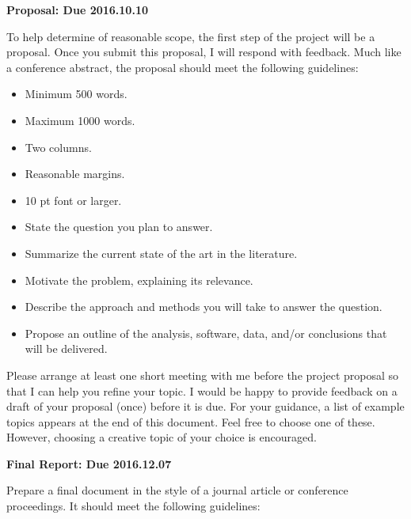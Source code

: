 \documentclass[12pts, answers]{exam}
\newcommand{\duedate}{2016.12.07}
\begin{document}
\begin{questions}
\addpoints
\question[10] \textbf{Proposal: Due 2016.10.10}

To help determine of reasonable scope, the first step of the project will be a
proposal. Once you submit this proposal, I will respond with feedback. Much
like a conference abstract, the proposal should meet the following guidelines:

\begin{itemize}
\item Minimum 500 words.
\item Maximum 1000 words.
\item Two columns.
\item Reasonable margins.
\item 10 pt font or larger.
\item State the question you plan to answer.
\item Summarize the current state of the art in the literature.
\item Motivate the problem, explaining its relevance.
\item Describe the approach and methods you will take to answer the question.
\item Propose an outline of the analysis, software, data, and/or conclusions that will be delivered.
\end{itemize}

Please arrange at least one short meeting with me before the project proposal
so that I can help you refine your topic. I would be happy to provide feedback
on a draft of your proposal (once) before it is due. For your guidance, a list
of example topics appears at the end of this document. Feel free to choose one
of these.  However, choosing a creative topic of your choice is
encouraged.


\question[90] \textbf{Final Report: Due \duedate}

Prepare a final document in the style of a journal article or conference
proceedings. It should meet the following guidelines:


\end{questions}
\end{document}
